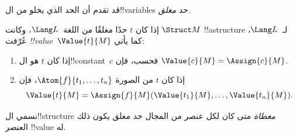 \documentclass[../../../include/open-logic-section]{subfiles}
\begin{document}


\begin{explain}
قد تقدم أن الحد الذي يخلو من ال!!{variable}s حد \emph{مغلق}.
\end{explain}

\begin{defn}
إذا كان $t$ حدًا مغلقًا من اللغة~$\Lang L$، وكانت $\Struct M$
!!a{structure} لـ~$\Lang L$، عُرّفت \emph{!!{value}}~$\Value{t}{M}$
كما يأتي:
\begin{enumerate}
\item إذا كان $t$ هو ال!!{constant}~$c$ فحسب، فإن
  $\Value{c}{M} = \Assign{c}{M}$.
\item إذا كان $t$ من الصورة $\Atom{f}{t_1, \ldots, t_n}$، فإن
  \[
  \Value{t}{M} = \Assign{f}{M}(\Value{t_1}{M}, \ldots,
  \Value{t_n}{M}).
  \]
\end{enumerate}
\end{defn}

\begin{defn}
نسمي ال!!{structure} \emph{مغطاة} متى كان لكل عنصر من المجال
حد مغلق يكون ذلك العنصر !!{value} له.
\end{defn}
\end{document}
